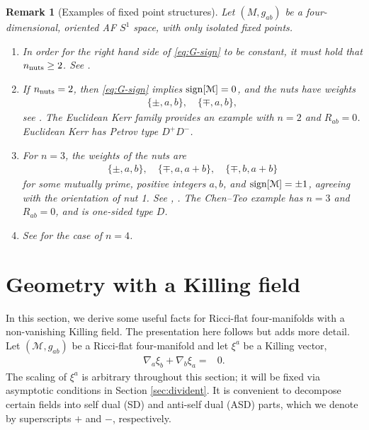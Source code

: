 \documentclass[a4paper,10pt,reqno]{amsart}
\newcommand{\sign}{\mathop{\rm sign}}
\newcommand{\cM}{\mathcal{M}}
\theoremstyle{plain}
\newtheorem{remark}[thm]{Remark}
\newcommand{\nnuts}{n_{\text{\rm nuts}}}
\numberwithin{equation}{section}
\begin{document}
\begin{remark}[Examples of fixed point structures]
\label{rem:nutfacts} 
Let $(M, g_{ab})$ be a four-dim\-en\-sional, oriented AF $S^1$ space, with only isolated fixed points. 
\begin{enumerate} 
\item 
In order for the right hand side of \eqref{eq:G-sign} to be constant, it must hold that $\nnuts \geq 2$. See \cite[Remark 3.2]{MR3343967}. 
\item \label{point:2nut} 
If $\nnuts=2$, then \eqref{eq:G-sign} implies $\sign[\cM]=0$, and the nuts have weights 
\begin{align}
\{\pm, a, b\}, \quad  \{\mp,a,b\},
\end{align} 
see \cite[Remark 3.4]{MR3343967}. The Euclidean Kerr family provides an example with $n=2$ and $R_{ab} = 0$. Euclidean Kerr has Petrov type $D^+D^-$. 
\item \label{point:3nut} 
For $n=3$, the weights of the nuts are 
\begin{align} 
\{\pm, a,b\} , \quad \{\mp, a, a+b\}, \quad \{ \mp, b, a+b\}
\end{align} 
for some mutually prime, positive integers $a,b$, and $\sign[\cM] = \pm 1$, agreeing with the orientation of nut 1. See \cite[Theorem 1.8]{MR3343967}, \cite[Theorem 7.1]{2018JGP...133..181J}. The Chen--Teo example \cite{2011PhLB..703..359C} has $n=3$ and $R_{ab} = 0$, and is one-sided type $D$.
\item 
See \cite[Theorem 7.2]{2018JGP...133..181J} for the case of $n=4$.  
\end{enumerate} 
\end{remark}


%
\section{Geometry with a Killing field} \label{sec:S1inst} 
%

In this section, we derive some useful facts for Ricci-flat four-manifolds with a non-vanishing Killing field. The presentation here follows \cite{gibbons:hawking:1979} but adds more detail. 
Let $(\cM, g_{ab})$ be a Ricci-flat four-manifold and let 
$\xi^a$ be a Killing vector,
\begin{align}
\nabla_{a}\xi_{b} + \nabla_{b}\xi_{a}={}&0.
\end{align}
The scaling of $\xi^a$ is arbitrary throughout this section; it will be fixed via asymptotic conditions in Section \ref{sec:divident}. 
It is convenient to decompose certain fields into self dual (SD) and anti-self dual (ASD) parts, which we denote by superscripts $+$ and $-$, respectively.
\end{document}
